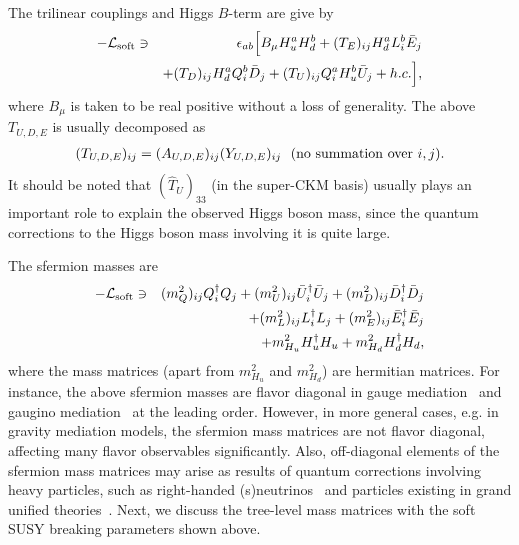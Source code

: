 \documentclass[preprint,3p,12pt]{elsarticle}
\begin{document}
{%
The trilinear couplings and Higgs $B$-term are give by
\begin{eqnarray}
-\mathcal{L}_{\rm soft} &\ni& \epsilon_{ab} \Bigl[ B_\mu H_u^a H_d^b +  (T_E)_{ij} H_d^a L^b_i \bar E_j \nonumber \\
&&+  (T_D)_{ij} H_d^a Q^b_i \bar D_j +  (T_U)_{ij} Q^a_i H_u^b \bar U_j + h.c.
\Bigr], \label{eq:Lsoft_trilinear}
\end{eqnarray}
where $B_\mu$ is taken to be real positive without a loss of generality. 
The above $T_{U,D,E}$ is usually decomposed as 
\begin{eqnarray}
(T_{U, D, E})_{ij} = (A_{U, D, E})_{ij}  (Y_{U, D, E})_{ij} \ \ ({\rm no\,\, summation\,\, over} \,\, i, j).
\end{eqnarray}
It should be noted that $(\hat T_{U})_{33}$ (in the super-CKM basis) usually plays an important role to explain the observed Higgs boson mass, since the quantum corrections to the Higgs boson mass involving it is quite large. 

The sfermion masses are 
\begin{eqnarray}
-\mathcal{L}_{\rm soft} &\ni& 
(m_{Q}^2)_{ij} Q_i^\dag Q_j + (m_{U}^2)_{ij} \bar U_i^\dag \bar U_j + (m_{D}^2)_{ij} \bar D_i^\dag \bar D_j \nonumber \\
&&+ (m_{L}^2)_{ij} L_i^\dag L_j + (m_{E}^2)_{ij} \bar E_i^\dag \bar E_j  \nonumber \\
&&+ m_{H_u}^2 H_u^\dag H_u + m_{H_d}^2 H_d^\dag H_d 
, \label{eq:Lsoft_mass}
\end{eqnarray}
where the mass matrices (apart from $m_{H_u}^2$ and $m_{H_d}^2$) are hermitian matrices. For instance, the above sfermion masses are flavor diagonal in gauge mediation~\cite{Dine:1993yw,Dine:1994vc,Dine:1995ag} and gaugino mediation~\cite{Inoue:1991rk,Kaplan:1999ac,Chacko:1999mi} at the leading order. 
However, in more general cases, e.g. in gravity mediation models, 
the sfermion mass matrices are not flavor diagonal, affecting many flavor observables significantly. 
Also, off-diagonal elements of the sfermion mass matrices may arise as results of quantum corrections involving heavy particles, such as right-handed (s)neutrinos~\cite{Borzumati:1986qx, Hisano:1995nq, Hisano:1995cp} and  particles existing in grand unified theories~\cite{Barbieri:1995tw, Moroi:2000mr, Barenboim:2000ev,  Moroi:2000tk}.
%
Next, we discuss the tree-level mass matrices with the soft SUSY breaking parameters shown above. 

}
\end{document}
